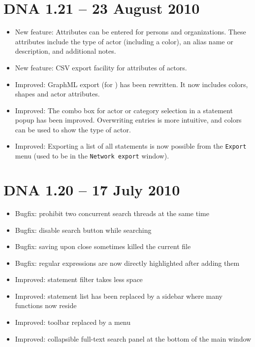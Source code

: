 \documentclass[12pt,a4paper]{scrreprt}
\newcommand{\visone}
{\textsf%
 {\protect\raisebox{.5ex}{\color[rgb]{0.1,0.1,0.1}v}%
  \protect\raisebox{.1ex}{\color[rgb]{0.3,0.3,0.3}i}%
  \protect\raisebox{-.1ex}{\color[rgb]{0.1,0.1,0.1}s}%
  \protect\raisebox{.1ex}{\color[rgb]{0.3,0.3,0.3}o}%
  \protect\raisebox{-.1ex}{\color[rgb]{0.1,0.1,0.1}n}%
  \protect\raisebox{-.4ex}{\color[rgb]{0.3,0.3,0.3}e}%
 }%
}
\newcommand{\code}[1]{\texttt{#1}}
\begin{document}
\section*{DNA 1.21 -- 23 August 2010}
\begin{itemize}
 \item New feature: Attributes can be entered for persons and organizations. These attributes include the type of actor (including a color), an alias name or description, and additional notes.
 \item New feature: CSV export facility for attributes of actors.
 \item Improved: GraphML export (for \visone) has been rewritten. It now includes colors, shapes and actor attributes.
 \item Improved: The combo box for actor or category selection in a statement popup has been improved. Overwriting entries is more intuitive, and colors can be used to show the type of actor.
 \item Improved: Exporting a list of all statements is now possible from the \code{Export} menu (used to be in the \code{Network export} window).
\end{itemize}

\section*{DNA 1.20 -- 17 July 2010}
\begin{itemize}
 \item Bugfix: prohibit two concurrent search threads at the same time
 \item Bugfix: disable search button while searching
 \item Bugfix: saving upon close sometimes killed the current file
 \item Bugfix: regular expressions are now directly highlighted after adding them
 \item Improved: statement filter takes less space
 \item Improved: statement list has been replaced by a sidebar where many functions now reside
 \item Improved: toolbar replaced by a menu
 \item Improved: collapsible full-text search panel at the bottom of the main window
\end{itemize}
\end{document}
